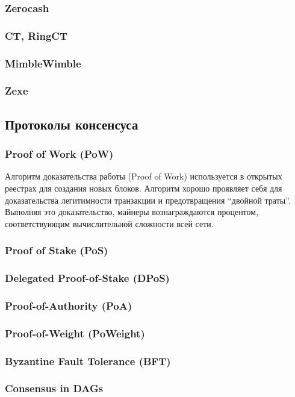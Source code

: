 \subsubsection{Zerocash}
\subsubsection{CT, RingCT}
\subsubsection{MimbleWimble}
\subsubsection{Zexe}


\subsection{Протоколы консенсуса}
\subsubsection{Proof of Work (PoW)}
Алгоритм доказательства работы (Proof of Work) используется в открытых реестрах
для создания новых блоков. Алгоритм хорошо проявляет себя для доказательства
легитимности транзакции и предотвращения ``двойной траты''.  Выполняя это
доказательство, майнеры вознаграждаются процентом, соответствующим
вычислительной сложности всей сети.
\subsubsection{Proof of Stake (PoS)}
\subsubsection{Delegated Proof-of-Stake (DPoS)}
\subsubsection{Proof-of-Authority (PoA)}
\subsubsection{Proof-of-Weight (PoWeight)}
\subsubsection{Byzantine Fault Tolerance (BFT)}
\subsubsection{Consensus in DAGs}
